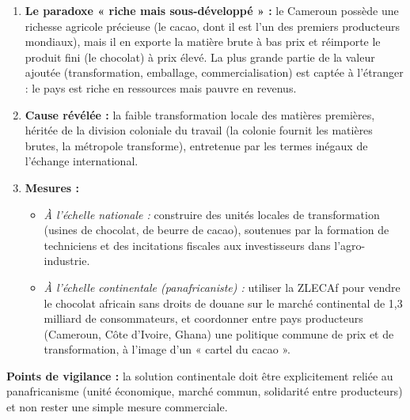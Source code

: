 \documentclass[11pt]{article}
\newcommand{\cle}[1]{{\popxbold\color{popdark}#1}}
\begin{document}
\begin{corrige}
\begin{enumerate}
\item \textbf{Le paradoxe « riche mais sous-développé » :} le Cameroun possède une richesse agricole précieuse (le cacao, dont il est l'un des premiers producteurs mondiaux), mais il en exporte la matière brute à bas prix et réimporte le produit fini (le chocolat) à prix élevé. La plus grande partie de la valeur ajoutée (transformation, emballage, commercialisation) est captée à l'étranger : le pays est riche en ressources mais pauvre en revenus.
\item \textbf{Cause révélée :} la \cle{faible transformation locale des matières premières}, héritée de la division coloniale du travail (la colonie fournit les matières brutes, la métropole transforme), entretenue par les \cle{termes inégaux de l'échange} international.
\item \textbf{Mesures :}
\begin{itemize}
\item \emph{À l'échelle nationale :} construire des unités locales de transformation (usines de chocolat, de beurre de cacao), soutenues par la formation de techniciens et des incitations fiscales aux investisseurs dans l'agro-industrie.
\item \emph{À l'échelle continentale (panafricaniste) :} utiliser la ZLECAf pour vendre le chocolat africain sans droits de douane sur le marché continental de 1,3 milliard de consommateurs, et coordonner entre pays producteurs (Cameroun, Côte d'Ivoire, Ghana) une politique commune de prix et de transformation, à l'image d'un « cartel du cacao ».
\end{itemize}
\end{enumerate}
\textbf{Points de vigilance :} la solution continentale doit être explicitement reliée au panafricanisme (unité économique, marché commun, solidarité entre producteurs) et non rester une simple mesure commerciale.
\end{corrige}
\end{document}
